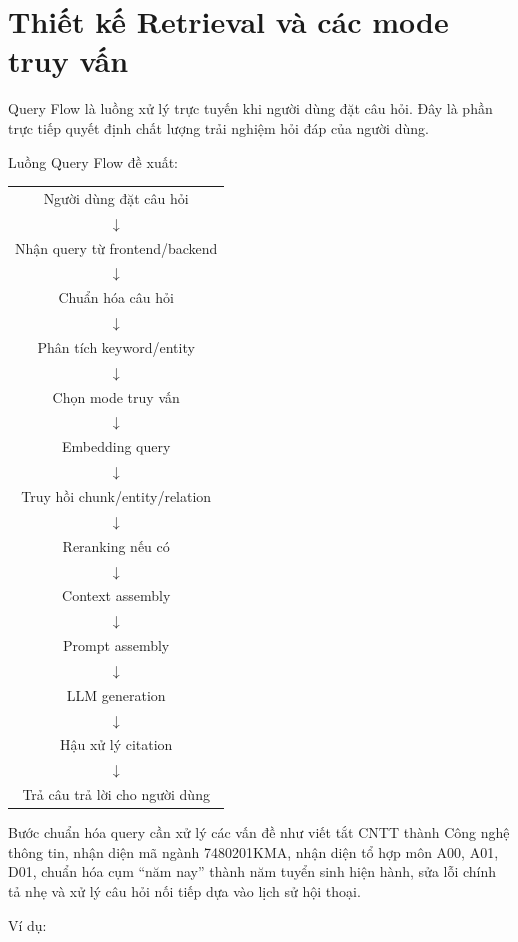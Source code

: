 \section{Thiết kế Retrieval và các mode truy vấn}

Query Flow là luồng xử lý trực tuyến khi người dùng đặt câu hỏi. Đây là phần trực tiếp quyết định chất lượng trải nghiệm hỏi đáp của người dùng.

Luồng Query Flow đề xuất:

\begin{center}
\begin{tabular}{c}
Người dùng đặt câu hỏi \\
$\downarrow$ \\
Nhận query từ frontend/backend \\
$\downarrow$ \\
Chuẩn hóa câu hỏi \\
$\downarrow$ \\
Phân tích keyword/entity \\
$\downarrow$ \\
Chọn mode truy vấn \\
$\downarrow$ \\
Embedding query \\
$\downarrow$ \\
Truy hồi chunk/entity/relation \\
$\downarrow$ \\
Reranking nếu có \\
$\downarrow$ \\
Context assembly \\
$\downarrow$ \\
Prompt assembly \\
$\downarrow$ \\
LLM generation \\
$\downarrow$ \\
Hậu xử lý citation \\
$\downarrow$ \\
Trả câu trả lời cho người dùng
\end{tabular}
\end{center}

Bước chuẩn hóa query cần xử lý các vấn đề như viết tắt CNTT thành Công nghệ thông tin, nhận diện mã ngành 7480201KMA, nhận diện tổ hợp môn A00, A01, D01, chuẩn hóa cụm ``năm nay'' thành năm tuyển sinh hiện hành, sửa lỗi chính tả nhẹ và xử lý câu hỏi nối tiếp dựa vào lịch sử hội thoại.

Ví dụ:

